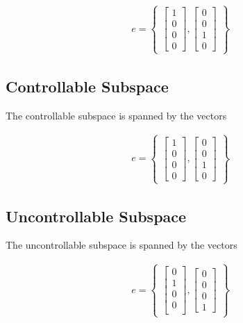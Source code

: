 \documentclass[]{article}
\begin{document}
\begin{align*}
{e} = \begin{Bmatrix}
\begin{bmatrix}
1\\
0\\
0\\
0
\end{bmatrix}, \begin{bmatrix}
0\\
0\\
1\\
0
\end{bmatrix}
\end{Bmatrix}
\end{align*}

\subsection{Controllable Subspace}
The controllable subspace is spanned by the vectors 

\begin{align*}
{e} = \begin{Bmatrix}
\begin{bmatrix}
1\\
0\\
0\\
0
\end{bmatrix}, \begin{bmatrix}
0\\
0\\
1\\
0
\end{bmatrix}
\end{Bmatrix}
\end{align*}

\subsection{Uncontrollable Subspace}
The uncontrollable subspace is spanned by the vectors

\begin{align*}
{e} = \begin{Bmatrix}
\begin{bmatrix}
0\\
1\\
0\\
0\\
\end{bmatrix}, \begin{bmatrix}
0\\
0\\
0\\
1
\end{bmatrix}
\end{Bmatrix}
\end{align*}
\end{document}

